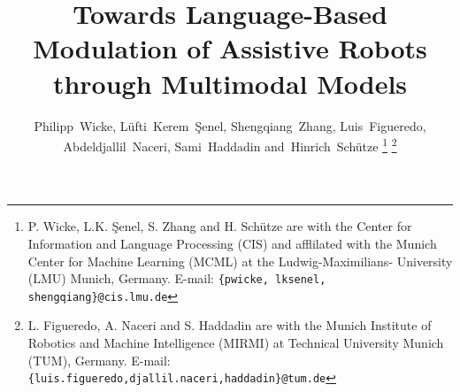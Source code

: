 \documentclass[journal]{IEEEtran}
\begin{document}
%
\title{Towards Language-Based Modulation of Assistive Robots through Multimodal Models}
%
%
%

\author{Philipp~Wicke,
        L\"{u}fti~Kerem~\c{S}enel,
        Shengqiang~Zhang,
        Luis~Figueredo,
        Abdeldjallil~Naceri,
        Sami~Haddadin
        and~Hinrich~Sch\"{u}tze%
\thanks{P. Wicke, L.K. \c{S}enel, S. Zhang and H. Sch\"{u}tze are with 
the Center for Information and Language Processing (CIS) and afflilated 
with the Munich Center for Machine Learning (MCML) at the Ludwig-Maximilians-
University (LMU) Munich, Germany. E-mail: \texttt{\{pwicke, lksenel,  shengqiang\}@cis.lmu.de}
}%
\thanks{L. Figueredo, A. Naceri and S. Haddadin are with 
the Munich Institute of Robotics and Machine Intelligence (MIRMI)
at Technical University Munich (TUM), Germany. E-mail:
\texttt{\{luis.figueredo,djallil.naceri,haddadin\}@tum.de}}%
}

% 
%
\end{document}
